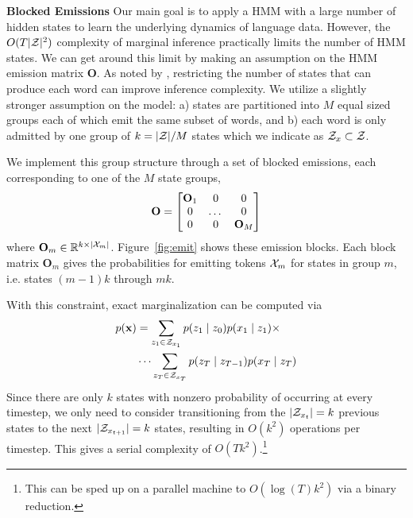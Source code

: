 \documentclass[11pt,a4paper]{article}
\begin{document}
\vspace{0.2cm}


\noindent
\textbf{Blocked Emissions}
Our main goal is to apply a HMM with a large number of hidden states to 
learn the underlying dynamics of language data.
However, the $O(T|\mathcal{Z}|^2)$ complexity of marginal inference
practically limits the number of HMM states.
We can get around this limit by making an assumption on the HMM emission matrix $\mathbf{O}$.
As noted by \citet{dedieu2019learning}, 
restricting the number of states that can produce each word can improve inference complexity. 
We utilize a slightly stronger assumption on the model:
a) states are partitioned into $M$ equal sized groups each
of which emit the same subset of words, 
and b) each word is only admitted by one group of
$k= |\mathcal{Z}| / M$ states which we indicate as $\mathcal{Z}_x \subset {\cal Z}$. 

We implement this group structure through a set of blocked emissions,
each corresponding to one of the $M$ state groups,
\begin{equation*}
\mathbf{O} = \begin{bmatrix} \mathbf{O}_1 & 0 & 0 \\ 0 & $\dots$ & 0 \\ 0 & 0 & \mathbf{O}_M \\
\end{bmatrix}
\end{equation*}
where $\mathbf{O}_m \in \mathbb{R}^{ k \times |\mathcal{X}_m|}$.
Figure~\ref{fig:emit} shows these emission blocks.
Each block matrix $\mathbf{O}_m$ gives the probabilities for emitting tokens $\mathcal{X}_m$ for states
in group $m$, i.e. states $(m-1)k$ through $mk$.

With this constraint, exact marginalization can be computed via 
\begin{equation}
\label{eqn:sparse_marginalization}
\begin{aligned}
p(\mathbf{x}) &= \sum_{z_1 \in \mathcal{Z}_{x_1}} p(z_1\mid z_0)p(x_1 \mid z_1) \times\\
    &\cdots
    \sum_{z_T \in \mathcal{Z}_{x_T}} p(z_T \mid z_{T-1})p(x_T \mid z_T)
\end{aligned}
\end{equation}
Since there are only $k$ states with nonzero probability of occurring
at every timestep, we only need to consider transitioning from the $|\mathcal{Z}_{x_t}| = k$
previous states to the next $|\mathcal{Z}_{x_{t+1}}|=k$ states,
resulting in $O(k^2)$ operations per timestep.
This gives a serial complexity of $O(Tk^2)$.\footnote{
This can be sped up on a parallel machine to $O(\log(T)k^2)$
via a binary reduction.
}
\end{document}
